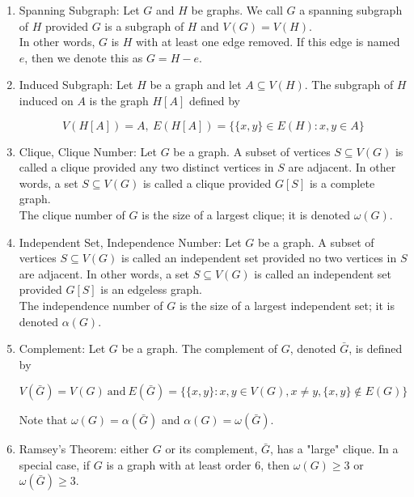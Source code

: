 \documentclass{article}
\begin{document}
\begin{enumerate}
    \item Spanning Subgraph: Let $G$ and $H$ be graphs. We call $G$ a spanning subgraph of $H$ provided $G$ is a subgraph of $H$ and $V(G)=V(H)$.\\
    
    In other words, $G$ is $H$ with at least one edge removed. If this edge is named $e$, then we denote this as $G=H-e$.
    
    \item Induced Subgraph: Let $H$ be a graph and let $A\subseteq V(H)$. The subgraph of $H$ induced on $A$ is the graph $H[A]$ defined by 
    
    $$V(H[A])=A, \: E(H[A])=\{\{x,y\}\in E(H): x,y\in A\}$$
    
    \item Clique, Clique Number: Let $G$ be a graph. A subset of vertices $S\subseteq V(G)$ is called a clique provided any two distinct vertices in $S$ are adjacent. In other words, a set $S\subseteq V(G)$ is called a clique provided $G[S]$ is a complete graph.\\
    
    The clique number of $G$ is the size of a largest clique; it is denoted $\omega (G)$.
    
    \item Independent Set, Independence Number: Let $G$ be a graph. A subset of vertices $S\subseteq V(G)$ is called an independent set provided no two vertices in $S$ are adjacent. In other words, a set $S\subseteq V(G)$ is called an independent set provided $G[S]$ is an edgeless graph.\\
    
    The independence number of $G$ is the size of a largest independent set; it is denoted $\alpha (G)$. 
    
    \item Complement: Let $G$ be a graph. The complement of $G$, denoted $\bar G$, is defined by 
    
    $$V(\bar G)=V(G)\: \text{and}\: E(\bar G)=\{\{x,y\}: x,y \in V(G), x\neq y, \{x,y\}\not\in E(G)\}$$
    
    Note that $\omega(G)=\alpha(\bar G)$ and $\alpha(G)=\omega(\bar G)$.
    
    \item Ramsey's Theorem: either $G$ or its complement, $\bar G$, has a "large" clique. In a special case, if $G$ is a graph with at least order $6$, then $\omega(G)\geq 3$ or $\omega(\bar G)\geq 3$.
    

\end{enumerate}
\end{document}

